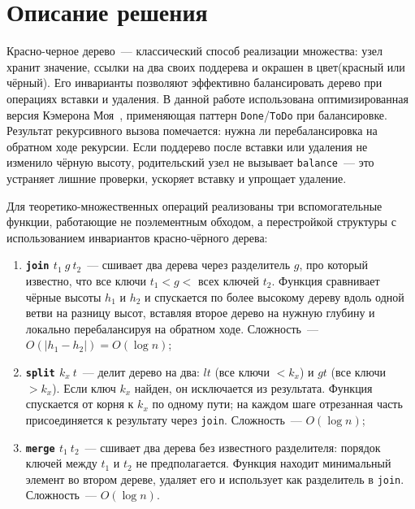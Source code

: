 \documentclass[a4paper]{article}
\begin{document}
\section{Описание решения}
Красно-черное дерево~--- классический способ реализации множества: узел хранит значение, 
ссылки на два своих поддерева и окрашен в цвет(красный или чёрный). 
Его инварианты позволяют эффективно балансировать дерево при операциях вставки и удаления. 
В данной работе использована оптимизированная версия Кэмерона Моя~\cite{Moy}, применяющая 
паттерн \texttt{Done}/\texttt{ToDo} при балансировке. Результат
рекурсивного вызова помечается: нужна ли перебалансировка на обратном ходе
рекурсии. Если поддерево после вставки или удаления не изменило чёрную высоту, 
родительский узел не вызывает \texttt{balance}~--- это
устраняет лишние проверки, ускоряет вставку и упрощает удаление.

Для теоретико-множественных операций реализованы три вспомогательные функции,
работающие не поэлементным обходом, а перестройкой структуры с использованием
инвариантов красно-чёрного дерева:
\begin{enumerate}
    \item \textbf{\texttt{join} $t_1\ g\ t_2$}~--- сшивает два дерева через
          разделитель $g$, про который известно, что все ключи $t_1 < g <$
          всех ключей $t_2$. Функция сравнивает чёрные высоты $h_1$ и $h_2$ и
          спускается по более высокому дереву вдоль одной ветви на разницу
          высот, вставляя второе дерево на нужную глубину и локально
          перебалансируя на обратном ходе. Сложность~--- $O(|h_1 - h_2|) =
          O(\log n)$;

    \item \textbf{\texttt{split} $k_x\ t$}~--- делит дерево на два: $lt$ (все
          ключи $< k_x$) и $gt$ (все ключи $> k_x$). Если ключ $k_x$ найден,
          он исключается из результата. Функция спускается от корня к $k_x$
          по одному пути; на каждом шаге отрезанная часть присоединяется к
          результату через \texttt{join}. Сложность~--- $O(\log n)$;

    \item \textbf{\texttt{merge} $t_1\ t_2$}~--- сшивает два дерева без
          известного разделителя: порядок ключей между $t_1$ и $t_2$ не
          предполагается. Функция находит минимальный элемент во втором
          дереве, удаляет его и использует как разделитель в \texttt{join}.
          Сложность~--- $O(\log n)$.
\end{enumerate}
\end{document}
